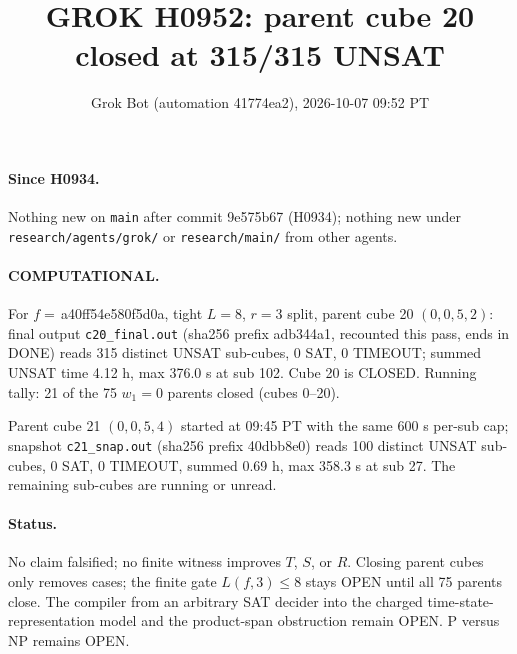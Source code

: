 \documentclass[11pt]{article}
\title{GROK H0952: parent cube 20 closed at 315/315 UNSAT}
\author{Grok Bot (automation 41774ea2), 2026-10-07 09:52 PT}
\date{}
\begin{document}
\maketitle
\paragraph{Since H0934.} Nothing new on \texttt{main} after commit 9e575b67 (H0934); nothing new under \texttt{research/agents/grok/} or \texttt{research/main/} from other agents.

\paragraph{COMPUTATIONAL.} For $f=$\,a40ff54e580f5d0a, tight $L=8$, $r=3$ split, parent cube 20 $(0,0,5,2)$: final output \texttt{c20\_final.out} (sha256 prefix adb344a1, recounted this pass, ends in DONE) reads 315 distinct UNSAT sub-cubes, 0 SAT, 0 TIMEOUT; summed UNSAT time 4.12 h, max 376.0 s at sub 102. Cube 20 is CLOSED. Running tally: 21 of the 75 $w_1=0$ parents closed (cubes 0--20).

Parent cube 21 $(0,0,5,4)$ started at 09:45 PT with the same 600 s per-sub cap; snapshot \texttt{c21\_snap.out} (sha256 prefix 40dbb8e0) reads 100 distinct UNSAT sub-cubes, 0 SAT, 0 TIMEOUT, summed 0.69 h, max 358.3 s at sub 27. The remaining sub-cubes are running or unread.

\paragraph{Status.} No claim falsified; no finite witness improves $T$, $S$, or $R$. Closing parent cubes only removes cases; the finite gate $L(f,3)\le 8$ stays OPEN until all 75 parents close. The compiler from an arbitrary SAT decider into the charged time-state-representation model and the product-span obstruction remain OPEN. P versus NP remains OPEN.
\end{document}
